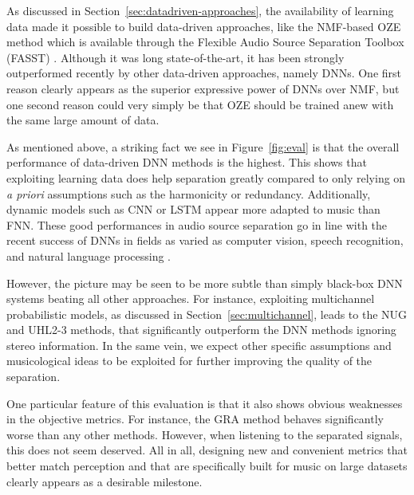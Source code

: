 {{%
As discussed in Section~\ref{sec:datadriven-approaches}, the availability of learning data made it possible to build data-driven approaches, like the NMF-based OZE method which is available through the Flexible Audio Source Separation Toolbox (FASST) \cite{salaun14,ozerov12}. Although it was long state-of-the-art, it has been strongly outperformed recently by other data-driven approaches, namely DNNs. One first reason clearly appears as the superior expressive power of DNNs over NMF, but one second reason could very simply be that OZE should be trained anew with the same large amount of data.

As mentioned above, a striking fact we see in Figure~\ref{fig:eval} is that the overall performance of data-driven DNN methods is the highest. This shows that exploiting learning data does help separation greatly compared to only relying on \textit{a priori} assumptions such as the harmonicity or redundancy. Additionally, dynamic models such as CNN or LSTM appear more adapted to music than FNN. These good performances in audio source separation go in line with the recent success of DNNs in fields as varied as computer vision, speech recognition, and natural language processing \cite{lecun15}.

However, the picture may be seen to be more subtle than simply black-box DNN systems beating all other approaches. For instance, exploiting multichannel probabilistic models, as discussed in Section~\ref{sec:multichannel}, leads to the NUG and UHL2-3 methods, that significantly outperform the DNN methods ignoring stereo information. In the same vein, we expect other specific assumptions and musicological ideas to be exploited for further improving the quality of the separation.

One particular feature of this evaluation is that it also shows obvious weaknesses in the objective metrics. For instance, the GRA method behaves significantly worse than any other methods. However, when listening to the separated signals, this does not seem deserved. All in all, designing new and convenient metrics that better match perception and that are specifically built for music on large datasets clearly appears as a desirable milestone.

}}
